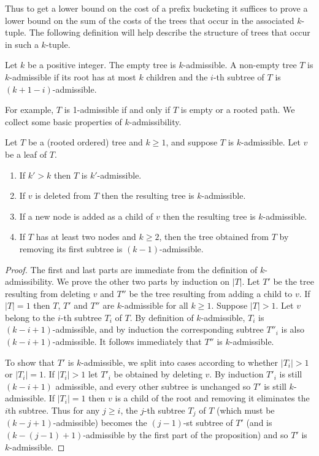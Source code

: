 \documentclass[unicode,review]{siamart1116}
\numberwithin{theorem}{section}
\begin{document}
Thus to get a lower bound on the cost of a prefix bucketing 
it suffices to prove a lower bound on the sum of the costs of
the trees that occur in the associated $k$-tuple. 
The following definition will help describe the structure of
trees that occur in such a $k$-tuple.

\begin{definition}[$k$-admissible]
\label{def:k-admissibility}
Let $k$ be a positive integer. 
The empty tree is $k$-admissible. A non-empty tree $T$ is $k$-admissible if its root has at most $k$ children
and the $i$-th  subtree of $T$ is $(k+1-i)$-admissible.
\end{definition}

For example, $T$ is 1-admissible if and only if $T$ is empty or a rooted path.
We collect some basic properties of $k$-admissibility.

\begin{proposition}
\label{lm:k-admissibility}
Let $T$ be a (rooted ordered) tree and $k \geq 1$, and suppose $T$ is $k$-admissible. Let $v$ be a leaf of $T$.
\begin{enumerate}
\item If  $k' > k$ then $T$ is $k'$-admissible.
\item If $v$ is deleted from $T$ then the resulting tree  is  $k$-admissible. 
\item If a new node is added as a child of $v$  then the resulting tree is $k$-admissible.
\item  If $T$ has at least two nodes and $k \geq 2$, 
then the tree obtained from $T$ by removing its first subtree is $(k-1)$-admissible.
\end{enumerate}
\end{proposition}
\begin{proof}
The first and last parts are  immediate from the definition of $k$-admissibility.
We prove the other two parts by induction on $|T|$. 
 Let $T'$ be the tree resulting from deleting $v$
and $T''$ be the tree resulting from adding a child to $v$.  If $|T|=1$ then  $T$, $T'$ and $T''$
are $k$-admissible for all $k \geq 1$.
Suppose $|T| > 1$.  Let $v$ belong to the $i$-th subtree $T_i$ of $T$.
By definition of $k$-admissible, $T_i$ is $(k-i+1)$-admissible, and by induction the corresponding
subtree $T''_i$ is also $(k-i+1)$-admissible.  It follows immediately that $T''$ is $k$-admissible.

To show that $T'$ is $k$-admissible, we split into cases according to whether $|T_i|>1$ or $|T_i|=1$.
If $|T_i|>1$ let $T'_i$ be obtained by deleting $v$.   By induction $T'_i$ is still $(k-i+1)$ admissible,
and every other subtree is unchanged so $T'$ is still $k$-admissible.  
If $|T_i|=1$ then $v$ is a child of the root and removing it eliminates the $i$th subtree. Thus for any $j \geq i$, 
the $j$-th subtree $T_j$
of $T$ (which must be $(k-j+1)$-admissible) becomes the $(j-1)$-st subtree of $T'$ (and is $(k-(j-1)+1)$-admissible 
by the first part of the proposition) and so $T'$ is $k$-admissible. 
\end{proof}
\end{document}
